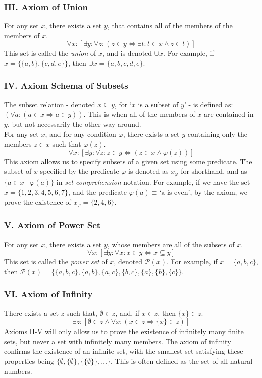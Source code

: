 \documentclass[11pt]{article}
\theoremstyle{definition}
\theoremstyle{theorem}
\theoremstyle{lemma}
\begin{document}
\subsubsection*{III. Axiom of Union}
For any set $x$, there exists a set $y$, that contains all of the members of the members of $x$.
$$\forall x: [\exists y: \forall z: (z\in y \Leftrightarrow \exists t: t\in x \wedge z\in t)]$$
This set is called the \emph{union} of $x$, and is denoted $\cup x$.
For example, if $x = \{\{a,b\}, \{c,d,e\}\}$, then $\cup x = \{a,b,c,d,e\}$.

\subsubsection*{IV. Axiom Schema of Subsets}
The subset relation - denoted $x\subseteq y$, for `$x$ is a subset of $y$' - is defined as: $(\forall a: (a\in x \Rightarrow a\in y))$. This is when all of the members of $x$ are contained in $y$, but not necessarily the other way around.\\

\noindent
For any set $x$, and for any condition $\varphi$, there exists a set $y$ containing only the members $z \in x$ such that $\varphi(z)$.
$$\forall x: [\exists y: \forall z: z\in y \Leftrightarrow (z \in x \wedge \varphi(z))] $$
This axiom allows us to specify subsets of a given set using some predicate. The subset of $x$ specified by the predicate $\varphi$ is denoted as $x_\varphi$ for shorthand, and as $\{a\in x \mid \varphi(a)\}$ in \emph{set comprehension} notation. For example, if we have the set $x = \{1,2,3,4,5,6,7\}$, and the predicate $\varphi(a) \equiv \text{`a is even'}$, by the axiom, we prove the existence of $x_\varphi = \{2,4,6\}$.

\subsubsection*{V. Axiom of Power Set}
For any set $x$, there exists a set $y$, whose members are all of the subsets of $x$.
$$\forall x: [\exists y: \forall x: x\in y \Leftrightarrow x \subseteq y]$$
This set is called the \emph{power set} of $x$, denoted $\mathcal{P}(x)$.
For example, if $x = \{a,b,c\}$, then $\mathcal{P}(x) = \{\{a,b,c\},\{a,b\},\{a,c\},\{b,c\}, \{a\}, \{b\}, \{c\}\}$.

\subsubsection*{VI. Axiom of Infinity}
There exists a set $z$ such that, $\emptyset \in z$, and, if $x\in z$, then $\{x\}\in z$.
$$\exists z: [\emptyset\in z \wedge \forall x: (x\in z \Rightarrow \{x\}\in z)]$$
Axioms II-V will only allow us to prove the existence of infinitely many finite sets, but never a set with infinitely many members. The axiom of infinity confirms the existence of an infinite set, with the smallest set satisfying these properties being $\{ \emptyset, \{\emptyset\}, \{\{\emptyset\}\},\ldots \}$. This is often defined as the set of all natural numbers.
\end{document}
